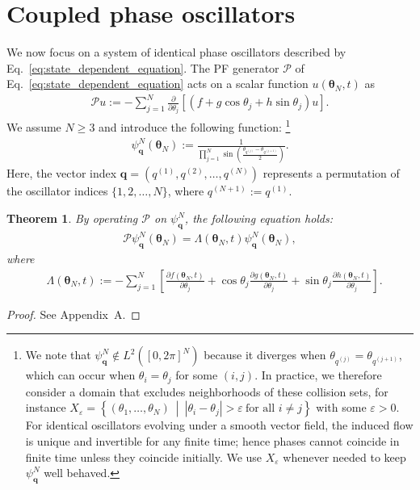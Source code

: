 \documentclass[
amsmath,amssymb,
]{revtex4-2}
\newtheorem{theorem}{Theorem}
\begin{document}
\section{Coupled phase oscillators}

We now focus on a system of identical phase oscillators described by 
Eq.~\eqref{eq:state_dependent_equation}. The PF generator  $\mathcal{P}$ of Eq.~\eqref{eq:state_dependent_equation} acts on a scalar function $u(\bm{\theta}_N, t)$ as
\begin{align}
\mathcal{P}u:= - \sum_{j=1}^{N} \frac{\partial}{\partial \theta_j} \left[ ( f + g \cos \theta_j + h \sin \theta_j ) u \right].
\end{align}
%
We assume $N \geq 3$ and introduce the following function:
%
\footnote{We note that $\psi^N_{\bm{q}}\notin L^2([0,2\pi]^N)$ because it diverges when
$\theta_{q^{(j)}}=\theta_{q^{(j+1)}}$,
which can occur when $\theta_i = \theta_j$ for some $(i, j)$. 
%
In practice, we therefore consider a domain that excludes neighborhoods of these collision sets, for instance $X_\varepsilon
= \left\{(\theta_1,\ldots,\theta_N)\ \middle|\ 
|\theta_i-\theta_j|>\varepsilon \ \text{for all } i\neq j
\right\}$ with some $\varepsilon>0$. For identical oscillators evolving under a smooth vector field, the induced flow is unique and invertible for any finite time; hence phases cannot coincide in finite time unless they coincide initially.
We use $X_\varepsilon$ whenever needed to keep $\psi_{\bm{q}}^N$ well behaved. }
% 
%
\begin{align}
    \label{eq:eigenfunction}
	\psi_{\bm{q}}^N(\bm{\theta}_N) := \frac{1}{\prod_{j=1}^N \sin\left( \frac{\theta_{q^{(j)}} - \theta_{q^{(j+1)}}}{2} \right)}.
\end{align}
%
Here, the vector index $\bm{q} = \left(q^{(1)}, q^{(2)}, \ldots, q^{(N)}\right)$ represents a permutation of the oscillator indices $\{1, 2, \ldots, N\}$, where $q^{(N+1)} := q^{(1)}$.
\par

% 
\begin{theorem}
\label{thm:PF_on_psi}
By operating $\mathcal{P}$ on $\psi^N_{\bm{q}}$, the following equation holds:
\begin{align}
	\label{eq:fp11} 
    \mathcal{P} \psi_{\bm{q}}^N(\bm{\theta}_N) = \Lambda(\bm{\theta}_N, t) \psi_{\bm{q}}^N(\bm{\theta}_N),
\end{align}
% 
where
% 
\begin{align}
\label{eq:PF_eigenvalue_equation}
    &\Lambda(\bm{\theta}_N, t)
    := -\sum_{j=1}^N \left[
    \frac{\partial f(\bm{\theta}_N, t)}{\partial \theta_j}
    + \cos \theta_j \frac{\partial g(\bm{\theta}_N, t)}{\partial \theta_j}
    + \sin \theta_j \frac{\partial h(\bm{\theta}_N, t)}{\partial \theta_j}
    \right].
\end{align}
\end{theorem}
%
\begin{proof}
    See Appendix~A.
\end{proof}
\end{document}
